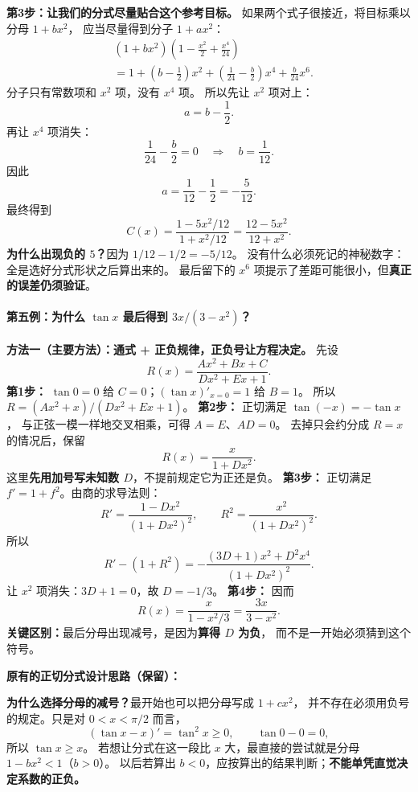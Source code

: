 \begin{proofbox}
\textbf{第3步：让我们的分式尽量贴合这个参考目标。}
如果两个式子很接近，将目标乘以分母 $1+bx^2$，
应当尽量得到分子 $1+ax^2$：
\[
 \begin{aligned}
 &(1+bx^2)\left(1-\frac{x^2}{2}+\frac{x^4}{24}\right)\\
 &=1+\left(b-\frac12\right)x^2
   +\left(\frac1{24}-\frac b2\right)x^4
   +\frac b{24}x^6.
 \end{aligned}
\]
分子只有常数项和 $x^2$ 项，没有 $x^4$ 项。
所以先让 $x^2$ 项对上：
\[
 a=b-\frac12.
\]
再让 $x^4$ 项消失：
\[
 \frac1{24}-\frac b2=0
 \quad\Longrightarrow\quad \boxed{b=\frac1{12}}.
\]
因此
\[
 a=\frac1{12}-\frac12=\boxed{-\frac5{12}}.
\]
最终得到
\[
 \boxed{C(x)=\frac{1-5x^2/12}{1+x^2/12}
 =\frac{12-5x^2}{12+x^2}}.
\]
\textbf{为什么出现负的 $5$？}因为 $1/12-1/2=-5/12$。
没有什么必须死记的神秘数字：全是选好分式形状之后算出来的。
最后留下的 $x^6$ 项提示了差距可能很小，但\textbf{真正的误差仍须验证}。

\medskip
\paragraph{第五例：为什么 $\tan x$ 最后得到 $3x/(3-x^2)$？}

\medskip
\noindent\textbf{方法一（主要方法）：通式 + 正负规律，正负号让方程决定。}
先设
\[
 R(x)=\frac{Ax^2+Bx+C}{Dx^2+Ex+1}.
\]
\textbf{第1步：} $\tan0=0$ 给 $C=0$；$(\tan x)'_{x=0}=1$ 给 $B=1$。
所以 $R=(Ax^2+x)/(Dx^2+Ex+1)$。
\textbf{第2步：} 正切满足 $\tan(-x)=-\tan x$，
与正弦一模一样地交叉相乘，可得
$A=E$、$AD=0$。
去掉只会约分成 $R=x$ 的情况后，保留
\[
 R(x)=\frac{x}{1+Dx^2}.
\]
这里\textbf{先用加号写未知数 $D$}，不提前规定它为正还是负。
\textbf{第3步：} 正切满足 $f'=1+f^2$。由商的求导法则：
\[
 R'=\frac{1-Dx^2}{(1+Dx^2)^2},\qquad
 R^2=\frac{x^2}{(1+Dx^2)^2}.
\]
所以
\[
 \boxed{R'-(1+R^2)=
 -\frac{(3D+1)x^2+D^2x^4}{(1+Dx^2)^2}}.
\]
让 $x^2$ 项消失：$3D+1=0$，故 $D=-1/3$。
\textbf{第4步：} 因而
\[
 \boxed{R(x)=\frac{x}{1-x^2/3}=\frac{3x}{3-x^2}}.
\]
\textbf{关键区别：}最后分母出现减号，是因为\textbf{算得 $D$ 为负}，
而不是一开始必须猜到这个符号。

\noindent\textbf{原有的正切分式设计思路（保留）：}


\textbf{为什么选择分母的减号？}最开始也可以把分母写成 $1+cx^2$，
并不存在必须用负号的规定。只是对 $0<x<\pi/2$ 而言，
\[
 (\tan x-x)'=\tan^2x\ge0,
 \qquad \tan0-0=0,
\]
所以 $\tan x\ge x$。
若想让分式在这一段比 $x$ 大，最直接的尝试就是分母 $1-bx^2<1$（$b>0$）。
以后若算出 $b<0$，应按算出的结果判断；\textbf{不能单凭直觉决定系数的正负。}


\end{proofbox}
